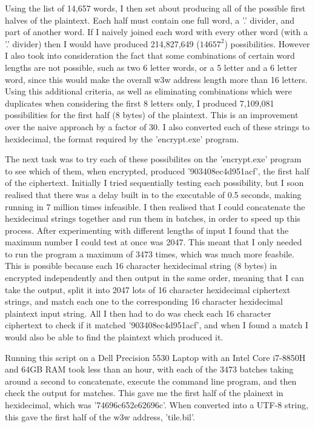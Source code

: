 \documentclass[a4paper, 11pt]{article}
\begin{document}
Using the list of 14,657 words, I then set about producing all of the possible first halves of the plaintext. 
Each half must contain one full word, a '.' divider, and part of another word. 
If I naively joined each word with every other word (with a '.' divider) then I would have produced 214,827,649 ($14657^2$) possibilities. 
However I also took into consideration the fact that some combinations of certain word lengths are not possible, 
such as two 6 letter words, or a 5 letter and a 6 letter word, since this would make the overall w3w address length more than 16 letters. 
Using this additional criteria, as well as eliminating combinations which were duplicates when considering the first 8 letters only, 
I produced 7,109,081 possibilities for the first half (8 bytes) of the plaintext. 
This is an improvement over the naive approach by a factor of 30. 
I also converted each of these strings to hexidecimal, the format required by the 'encrypt.exe' program. 

The next task was to try each of these possibilites on the 'encrypt.exe' program to see which of them, when encrypted, 
produced '903408ec4d951acf', the first half of the ciphertext. 
Initially I tried sequentially testing each possibility, but I soon realised that there was a delay built in to the executable of 0.5 seconds, 
making running in 7 million times infeasible. 
I then realised that I could concatenate the hexidecimal strings together and run them in batches, in order to speed up this process. 
After experimenting with different lengths of input I found that the maximum number I could test at once was 2047. 
This meant that I only needed to run the program a maximum of 3473 times, which was much more feasbile. 
This is possible because each 16 character hexidecimal string (8 bytes) in encrypted independently and then output in the same order, 
meaning that I can take the output, split it into 2047 lots of 16 character hexidecimal ciphertext strings, 
and match each one to the corresponding 16 character hexidecimal plaintext input string. 
All I then had to do was check each 16 character ciphertext to check if it matched '903408ec4d951acf', 
and when I found a match I would also be able to find the plaintext which produced it. 

Running this script on a Dell Precision 5530 Laptop with an Intel Core i7-8850H and 64GB RAM took less than an hour, 
with each of the 3473 batches taking around a second to concatenate, execute the command line program, and then check the output for matches. 
This gave me the first half of the plainext in hexidecimal, which was '74696c652e62696c'. 
When converted into a UTF-8 string, this gave the first half of the w3w address, 'tile.bil'. 
\end{document}
